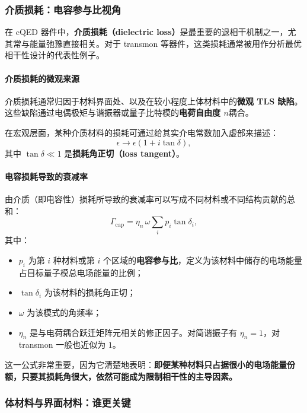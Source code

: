 \documentclass[12pt,a4paper,oneside]{ctexbook}
\begin{document}
\subsubsection{介质损耗：电容参与比视角}

在 cQED 器件中，\textbf{介质损耗（dielectric loss）}是最重要的退相干机制之一，尤其常与能量弛豫直接相关。对于 transmon 等器件，这类损耗通常被用作分析最优相干性设计的代表性例子。

\paragraph{介质损耗的微观来源}
介质损耗通常归因于材料界面处、以及在较小程度上体材料中的\textbf{微观 TLS 缺陷}。这些缺陷通过电偶极矩与谐振器或量子比特模的\textbf{电荷自由度 \(n\)}耦合。

在宏观层面，某种介质材料的损耗可通过给其实介电常数加入虚部来描述：
\[
\epsilon \rightarrow \epsilon(1+i\tan\delta),
\]
其中 \(\tan\delta\ll 1\) 是\textbf{损耗角正切（loss tangent）}。

\paragraph{电容损耗导致的衰减率}
由介质（即电容性）损耗所导致的衰减率可以写成不同材料或不同结构贡献的总和：
\begin{equation}
\Gamma_{\mathrm{cap}}=\eta_n \,\omega \sum_i p_i \tan\delta_i,
\tag{39}
\end{equation}
其中：
\begin{itemize}
    \item \(p_i\) 为第 \(i\) 种材料或第 \(i\) 个区域的\textbf{电容参与比}，定义为该材料中储存的电场能量占目标量子模总电场能量的比例；
    \item \(\tan\delta_i\) 为该材料的损耗角正切；
    \item \(\omega\) 为该模式的角频率；
    \item \(\eta_n\) 是与电荷耦合跃迁矩阵元相关的修正因子。对简谐振子有 \(\eta_n=1\)，对 transmon 一般也近似为 \(1\)。
\end{itemize}

这一公式非常重要，因为它清楚地表明：\textbf{即便某种材料只占据很小的电场能量份额，只要其损耗角很大，依然可能成为限制相干性的主导因素。}

\subsubsection{体材料与界面材料：谁更关键}
\end{document}
